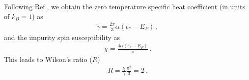 \documentclass[aps,prb,preprint,groupedaddress]{revtex4-2}
\begin{document}
Following Ref.\cite{nozieres1974fermi,coleman2015}, we obtain 
the zero temperature specific heat coefficient (in units of $k_{B}=1$) as
\begin{eqnarray}
\gamma = \frac{2\pi}{3}\alpha(\epsilon_{*}-E_{F})~,
\end{eqnarray} 
and the impurity spin susceptibility as
\begin{eqnarray}
\chi=\frac{4\alpha(\epsilon_{*}-E_{F})}{\pi}~.
\end{eqnarray}
This leads to Wilson's ratio ($R$)
\begin{eqnarray}
R=\frac{\chi}{\gamma}\frac{\pi^{2}}{3}=2~.
\end{eqnarray}
\end{document}
